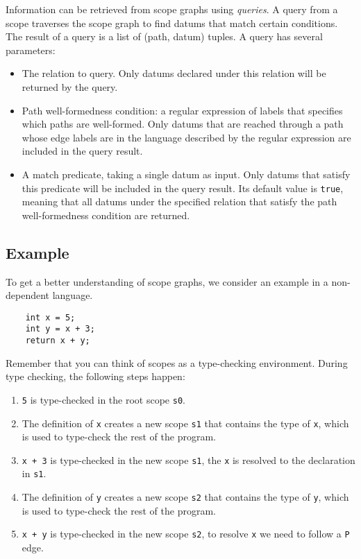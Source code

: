 Information can be retrieved from scope graphs using \textit{queries}. A query from a scope traverses the scope graph to find datums that match certain conditions. The result of a query is a list of (path, datum) tuples. A query has several parameters:
\begin{itemize}
	\item The relation to query. Only datums declared under this relation will be returned by the query.
	\item Path well-formedness condition: a regular expression of labels that specifies which paths are well-formed. Only datums that are reached through a path whose edge labels are in the language described by the regular expression are included in the query result.
	\item A match predicate, taking a single datum as input. Only datums that satisfy this predicate will be included in the query result. Its default value is \verb|true|, meaning that all datums under the specified relation that satisfy the path well-formedness condition are returned.
\end{itemize}

\subsection*{Example}
To get a better understanding of scope graphs, we consider an example in a non-dependent language. 
\lstset{language=java}
\begin{lstlisting}
	int x = 5;
	int y = x + 3;
	return x + y;
\end{lstlisting}
Remember that you can think of scopes as a type-checking environment. During type checking, the following steps happen:
\begin{enumerate}
	\item \verb|5| is type-checked in the root scope \verb|s0|. 
	\item The definition of \verb|x| creates a new scope \verb|s1| that contains the type of \verb|x|, which is used to type-check the rest of the program.
	\item \verb|x + 3| is type-checked in the new scope \verb|s1|, the \verb|x| is resolved to the declaration in \verb|s1|.
	\item The definition of \verb|y| creates a new scope \verb|s2| that contains the type of \verb|y|, which is used to type-check the rest of the program.
	\item \verb|x + y| is type-checked in the new scope \verb|s2|, to resolve \verb|x| we need to follow a \verb|P| edge.
\end{enumerate}

\lstset{language=}
